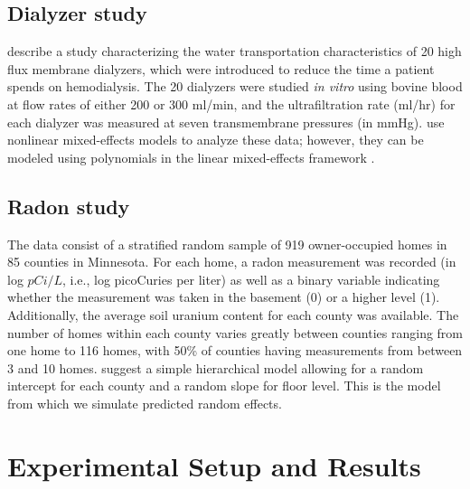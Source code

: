 \documentclass[12pt]{article} %
\begin{document}
\subsection{Dialyzer study}\label{data:dialyzer}

\cite{Vonesh:1992us} describe a study characterizing the water transportation characteristics of 20 high flux membrane dialyzers, which were introduced to reduce the time a patient spends on hemodialysis. The 20 dialyzers were studied \emph{in vitro} using bovine blood at flow rates of either 200 or 300 ml/min, and the ultrafiltration rate (ml/hr) for each dialyzer was measured at seven transmembrane pressures (in mmHg). \cite{Vonesh:1992us} use nonlinear mixed-effects models to analyze these data; however, they can be modeled using polynomials in the linear mixed-effects framework \citep[Section 9.5]{Littell:2006}.

\subsection{Radon study}\label{data:radon}

The data consist of a stratified random sample of 919 owner-occupied homes in 85 counties in Minnesota. For each home, a radon measurement was recorded (in log $pCi/L$, i.e., log picoCuries per liter) as well as a binary variable indicating whether the measurement was taken in the basement (0) or a higher level (1). Additionally, the average soil uranium content for each county was available. The number of homes within each county varies greatly between counties ranging from one home to 116 homes, with 50\% of counties having measurements from between 3 and 10 homes. \cite{Gelman:2006ue} suggest a simple hierarchical model allowing for a random intercept for each county and a random slope for floor level. This is the model from which we simulate predicted random effects.

\section{Experimental Setup and Results}\label{study}
\end{document}

